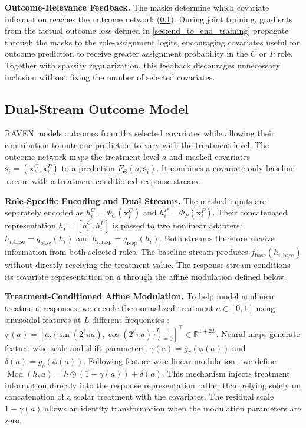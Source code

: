 \documentclass[twoside]{article}
\theoremstyle{plain}
\theoremstyle{definition}
\theoremstyle{remark}
\newtheorem{proof sketch}[theorem]{Proof Sketch}
\begin{document}
\textbf{Outcome-Relevance Feedback.}
The masks determine which covariate information reaches the outcome network (\cref{sec:outcome_prediction}).
During joint training, gradients from the factual outcome loss defined in \cref{sec:end_to_end_training} propagate through the masks to the role-assignment logits, encouraging covariates useful for outcome prediction to receive greater assignment probability in the $C$ or $P$ role.
Together with sparsity regularization, this feedback discourages unnecessary inclusion without fixing the number of selected covariates.
\vspace{-0.5em}
\subsection{Dual-Stream Outcome Model}
\label{sec:outcome_prediction}
RAVEN models outcomes from the selected covariates while allowing their contribution to outcome prediction to vary with the treatment level.
The outcome network maps the treatment level $a$ and masked covariates $\mathbf{s}_i=(\mathbf{x}_i^C,\mathbf{x}_i^P)$ to a prediction $F_\Theta(a,\mathbf{s}_i)$.
It combines a covariate-only baseline stream with a treatment-conditioned response stream.

\textbf{Role-Specific Encoding and Dual Streams.}
The masked inputs are separately encoded as $h_i^C=\Phi_C(\mathbf{x}_i^C)$ and $h_i^P=\Phi_P(\mathbf{x}_i^P)$.
Their concatenated representation $h_i=[h_i^C;h_i^P]$ is passed to two nonlinear adapters: $h_{i,\mathrm{base}}=q_{\mathrm{base}}(h_i)$ and $h_{i,\mathrm{resp}}=q_{\mathrm{resp}}(h_i)$.
Both streams therefore receive information from both selected roles.
The baseline stream produces $f_{\mathrm{base}}(h_{i,\mathrm{base}})$ without directly receiving the treatment value.
The response stream conditions its covariate representation on $a$ through the affine modulation defined below.

\textbf{Treatment-Conditioned Affine Modulation.}
To help model nonlinear treatment responses, we encode the normalized treatment $a\in[0,1]$ using sinusoidal features at $L$ different frequencies \citep{mildenhall2020nerf,tancik2020fourier}: $\phi(a)=[a,\{\sin(2^\ell\pi a),\cos(2^\ell\pi a)\}_{\ell=0}^{L-1}]^\top\in\mathbb{R}^{1+2L}$.
Neural maps generate feature-wise scale and shift parameters, $\gamma(a)=g_\gamma(\phi(a))$ and $\delta(a)=g_\delta(\phi(a))$.
Following feature-wise linear modulation \citep{perez2018film}, we define $\operatorname{Mod}(h,a)=h\odot(1+\gamma(a))+\delta(a)$.
This mechanism injects treatment information directly into the response representation rather than relying solely on concatenation of a scalar treatment with the covariates.
The residual scale $1+\gamma(a)$ allows an identity transformation when the modulation parameters are zero.
\end{document}
